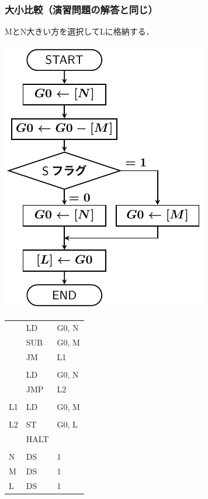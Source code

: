 \documentclass{beamer}                 %
\begin{document}
\begin{frame}
  \frametitle{大小比較（演習問題の解答と同じ）}
  MとN大きい方を選択してLに格納する．\\
  \vfill
  \begin{minipage}{0.5\columnwidth}
    \centerline{\includegraphics[scale=0.75]{../Tikz/flowI.pdf}}
  \end{minipage}
  \begin{minipage}{0.48\columnwidth}
    {\ttfamily\footnotesize
      \begin{tabular}{|l|l|l|}
              & LD     & G0, N    \\
              & SUB    & G0, M    \\
              & JM     & L1       \\
              &        &          \\
              & LD     & G0, N    \\
              & JMP    & L2       \\
              &        &          \\
      L1      & LD     & G0, M    \\
              &        &          \\
      L2      & ST     & G0, L    \\
              & HALT   &          \\
              &        &          \\
      N       & DS     & 1        \\
      M       & DS     & 1        \\
      L       & DS     & 1        \\
    \end{tabular}}
    \vfill
  \end{minipage}
\end{frame}
\end{document}

